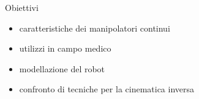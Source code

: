 \begin{frame}{Obiettivi}
    \begin{itemize}
        \item<1-> caratteristiche dei manipolatori continui
        \item<2-> utilizzi in campo medico
        \item<3-> modellazione del robot
        \item<4-> confronto di tecniche per la cinematica inversa
    \end{itemize}
    
\end{frame}

